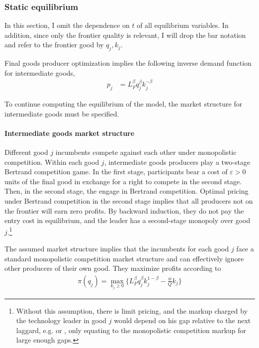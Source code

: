 \documentclass[11pt,english]{article}
\theoremstyle{remark}
\begin{document}
\subsubsection{Static equilibrium}

In this section, I omit the dependence on $t$ of all equilibrium variables. In addition, since only the frontier quality is relevant, I will drop the bar notation and refer to the frontier good by $q_j, k_j$.

Final goods producer optimization implies the following inverse demand function for intermediate goods, 
\begin{align*}
p_j &= L_F^{\beta} q_j^{\beta} k_j^{-\beta}	
\end{align*}

To continue computing the equilibrium of the model, the market structure for intermediate goods must be specified. 

\paragraph{Intermediate goods market structure} Different good $j$ incumbents compete against each other under monopolistic competition. Within each good $j$, intermediate goods producers play a two-stage Bertrand competition game. In the first stage, participants bear a cost of $\varepsilon > 0$ units of the final good in exchange for a right to compete in the second stage. Then, in the second stage, the engage in Bertrand competition. Optimal pricing under Bertrand competition in the second stage implies that all producers not on the frontier will earn zero profits. By backward induction, they do not pay the entry cost in equilibrium, and the leader has a second-stage monopoly over good $j$.\footnote{Without this assumption, there is limit pricing, and the markup charged by the technology leader in good $j$ would depend on his gap relative to the next laggard, e.g. \cite{baslandze_spinout_2019} or \cite{aghion_competition_2005}, only equating to the monopolistic competition markup for large enough gaps.}

The assumed market structure implies that the incumbents for each good $j$ face a standard monopolistic competition market structure and can effectively ignore other producers of their own good. They maximize profits according to
\begin{align}
\pi(q_j) = \max_{k_j \ge 0} \Big\{ L_F^{\beta} q_j^{\beta} k_j^{1-\beta} - \frac{\overline{w}}{Q} k_j \Big\} \label{incumbent_profit}
\end{align}
\end{document}
